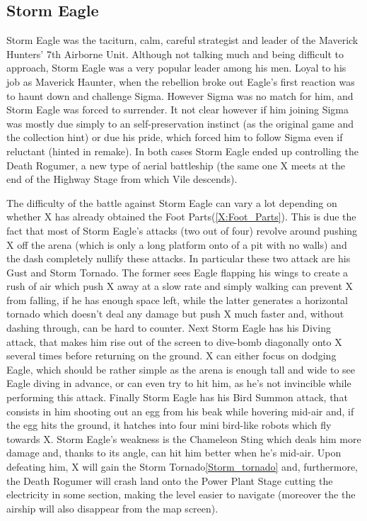  \subsection{Storm Eagle}\label{boss:Storm_Eagle}
 Storm Eagle was the taciturn, calm, careful strategist and leader of the Maverick Hunters' 7th Airborne Unit\cite{wiki:Storm_Eagle}. Although not talking much and being difficult to approach, Storm Eagle was a very popular leader among his men\cite{MHX:manual}. Loyal to his job as Maverick Haunter, when the rebellion broke out Eagle's first reaction was to haunt down and challenge Sigma. However Sigma was no match for him, and Storm Eagle was forced to surrender. It not clear however if him joining Sigma was mostly due simply to an self-preservation instinct (as the original game and the collection hint\cite{Xcoll1:Manual_X1}) or due his pride, which forced him to follow Sigma even if reluctant (hinted in remake). In both cases Storm Eagle ended up controlling the Death Rogumer, a new type of aerial battleship (the same one X meets at the end of the Highway Stage from which Vile descends).
 
 The difficulty of the battle against Storm Eagle can vary a lot depending on whether X has already obtained the Foot Parts(\ref{X:Foot_Parts}). This is due the fact that most of Storm Eagle's attacks (two out of four) revolve around pushing X off the arena (which is only a long platform onto of a pit with no walls) and the dash completely nullify these attacks. In particular these two attack are his Gust\cite{wiki:Storm_Eagle} and Storm Tornado. The former sees Eagle flapping his wings to create a rush of air which push X away at a slow rate and simply walking can prevent X from falling, if he has enough space left, while the latter generates a horizontal tornado which doesn't deal any damage but push X much faster and, without dashing through, can be hard to counter. Next Storm Eagle has his Diving attack, that makes him rise out of the screen to dive-bomb diagonally onto X several times before returning on the ground. X can either focus on dodging Eagle, which should be rather simple as the arena is enough tall and wide to see Eagle diving in advance, or can even try to hit him, as he's not invincible while performing this attack. Finally Storm Eagle has his Bird Summon attack, that consists in him shooting out an egg from his beak while hovering mid-air and, if the egg hits the ground, it hatches into four mini bird-like robots which fly towards X. Storm Eagle's weakness is the Chameleon Sting which deals him more damage and, thanks to its angle, can hit him better when he's mid-air. Upon defeating him, X will gain the Storm Tornado\ref{Storm_tornado} and, furthermore, the Death Rogumer will crash land onto the Power Plant Stage cutting the electricity in some section, making the level easier to navigate (moreover the the airship will also disappear from the map screen).
 
